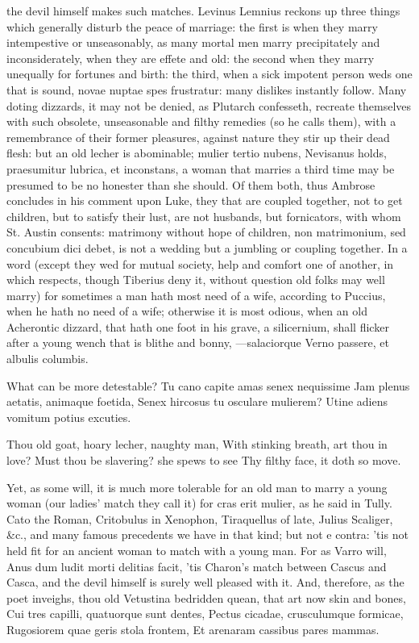 {the devil himself makes such matches. Levinus Lemnius reckons up
three things which generally disturb the peace of marriage: the first
is when they marry intempestive or unseasonably, as many mortal men
marry precipitately and inconsiderately, when they are effete and old:
the second when they marry unequally for fortunes and birth: the third,
when a sick impotent person weds one that is sound, novae nuptae spes
frustratur: many dislikes instantly follow. Many doting dizzards, it
may not be denied, as Plutarch confesseth, recreate themselves
with such obsolete, unseasonable and filthy remedies (so he calls
them), with a remembrance of their former pleasures, against nature
they stir up their dead flesh: but an old lecher is abominable; mulier
tertio nubens, Nevisanus holds, praesumitur lubrica, et
inconstans, a woman that marries a third time may be presumed to be no
honester than she should. Of them both, thus Ambrose concludes in his
comment upon Luke, they that are coupled together, not to get
children, but to satisfy their lust, are not husbands, but fornicators,
with whom St. Austin consents: matrimony without hope of children, non
matrimonium, sed concubium dici debet, is not a wedding but a jumbling
or coupling together. In a word (except they wed for mutual society,
help and comfort one of another, in which respects, though
Tiberius deny it, without question old folks may well marry) for
sometimes a man hath most need of a wife, according to Puccius, when he
hath no need of a wife; otherwise it is most odious, when an old
Acherontic dizzard, that hath one foot in his grave, a silicernium,
shall flicker after a young wench that is blithe and bonny,
---salaciorque
Verno passere, et albulis columbis.

What can be more detestable?
Tu cano capite amas senex nequissime
Jam plenus aetatis, animaque foetida,
Senex hircosus tu osculare mulierem?
Utine adiens vomitum potius excuties.

Thou old goat, hoary lecher, naughty man,
With stinking breath, art thou in love?
Must thou be slavering? she spews to see
Thy filthy face, it doth so move.

Yet, as some will, it is much more tolerable for an old man to marry a
young woman (our ladies' match they call it) for cras erit mulier, as
he said in Tully. Cato the Roman, Critobulus in Xenophon,
Tiraquellus of late, Julius Scaliger, \&c., and many famous
precedents we have in that kind; but not e contra: 'tis not held fit
for an ancient woman to match with a young man. For as Varro will, Anus
dum ludit morti delitias facit, 'tis Charon's match between
Cascus and Casca, and the devil himself is surely well pleased
with it. And, therefore, as the poet inveighs, thou old Vetustina
bedridden quean, that art now skin and bones,
Cui tres capilli, quatuorque sunt dentes,
Pectus cicadae, crusculumque formicae,
Rugosiorem quae geris stola frontem,
Et arenaram cassibus pares mammas.

}
